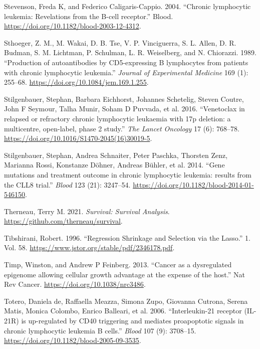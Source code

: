 \documentclass[11pt, a4paper, twosided]{book}
\newenvironment{CSLReferences}%
  {}%
  {\par}
\begin{document}
\begin{CSLReferences}{1}{0}
\leavevmode{}%
Stevenson, Freda K, and Federico Caligaris-Cappio. 2004. {``{Chronic lymphocytic leukemia: Revelations from the B-cell receptor}.''} Blood. \url{https://doi.org/10.1182/blood-2003-12-4312}.

\leavevmode{}%
Sthoeger, Z. M., M. Wakai, D. B. Tse, V. P. Vinciguerra, S. L. Allen, D. R. Budman, S. M. Lichtman, P. Schulman, L. R. Weiselberg, and N. Chiorazzi. 1989. {``{Production of autoantibodies by CD5-expressing B lymphocytes from patients with chronic lymphocytic leukemia}.''} \emph{Journal of Experimental Medicine} 169 (1): 255--68. \url{https://doi.org/10.1084/jem.169.1.255}.

\leavevmode{}%
Stilgenbauer, Stephan, Barbara Eichhorst, Johannes Schetelig, Steven Coutre, John F Seymour, Talha Munir, Soham D Puvvada, et al. 2016. {``{Venetoclax in relapsed or refractory chronic lymphocytic leukaemia with 17p deletion: a multicentre, open-label, phase 2 study}.''} \emph{The Lancet Oncology} 17 (6): 768--78. \url{https://doi.org/10.1016/S1470-2045(16)30019-5}.

\leavevmode{}%
Stilgenbauer, Stephan, Andrea Schnaiter, Peter Paschka, Thorsten Zenz, Marianna Rossi, Konstanze Döhner, Andreas Bühler, et al. 2014. {``{Gene mutations and treatment outcome in chronic lymphocytic leukemia: results from the CLL8 trial.}''} \emph{Blood} 123 (21): 3247--54. \url{https://doi.org/10.1182/blood-2014-01-546150}.

\leavevmode{}%
Therneau, Terry M. 2021. \emph{Survival: Survival Analysis}. \url{https://github.com/therneau/survival}.

\leavevmode{}%
Tibshirani, Robert. 1996. {``{Regression Shrinkage and Selection via the Lasso}.''} 1. Vol. 58. \url{https://www.jstor.org/stable/pdf/2346178.pdf}.

\leavevmode{}%
Timp, Winston, and Andrew P Feinberg. 2013. {``{Cancer as a dysregulated epigenome allowing cellular growth advantage at the expense of the host}.''} Nat Rev Cancer. \url{https://doi.org/10.1038/nrc3486}.

\leavevmode{}%
Totero, Daniela de, Raffaella Meazza, Simona Zupo, Giovanna Cutrona, Serena Matis, Monica Colombo, Enrico Balleari, et al. 2006. {``{Interleukin-21 receptor (IL-21R) is up-regulated by CD40 triggering and mediates proapoptotic signals in chronic lymphocytic leukemia B cells.}''} \emph{Blood} 107 (9): 3708--15. \url{https://doi.org/10.1182/blood-2005-09-3535}.


\end{CSLReferences}
\end{document}
